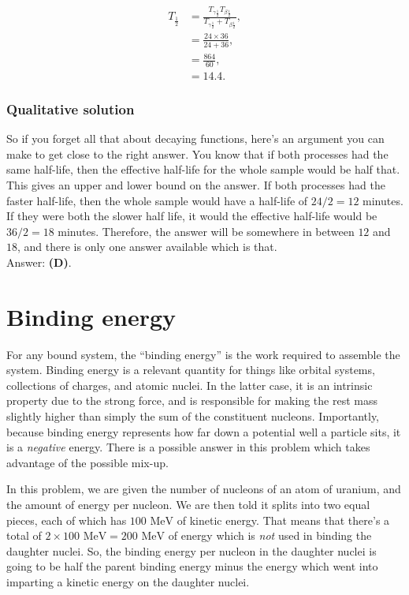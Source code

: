 \documentclass[11pt]{paper}
\newcommand{\answer}[1]{Answer: \textbf{(#1)}.}
\begin{document}
\begin{align}
T_{\frac{1}{2}} &= \frac{T_{\gamma\frac{1}{2}}T_{\beta\frac{1}{2}}}{T_{\gamma\frac{1}{2}}+T_{\beta\frac{1}{2}}},\\
&=\frac{24\times36}{24+36},\\
&=\frac{864}{60},\\
&=14.4.
\end{align}

\subsubsection*{Qualitative solution}
So if you forget all that about decaying functions, here's an argument you can make to get close to the right answer.  You know that if both processes had the same half-life, then the effective half-life for the whole sample would be half that.  This gives an upper and lower bound on the answer.  If both processes had the faster half-life, then the whole sample would have a half-life of $24/2 = 12$ minutes.  If they were both the slower half life, it would the effective half-life would be $36/2 = 18$ minutes.  Therefore, the answer will be somewhere in between $12$ and $18$, and there is only one answer available which is that.\\

\answer{D}

\section{Binding energy}
For any bound system, the ``binding energy'' is the work required to assemble the system.  Binding energy is a relevant quantity for things like orbital systems, collections of charges, and atomic nuclei.  In the latter case, it is an intrinsic property due to the strong force, and is responsible for making the rest mass slightly higher than simply the sum of the constituent nucleons.  Importantly, because binding energy represents how far down a potential well a particle sits, it is a \emph{negative} energy.  There is a possible answer in this problem which takes advantage of the possible mix-up.

In this problem, we are given the number of nucleons of an atom of uranium, and the amount of energy per nucleon.  We are then told it splits into two equal pieces, each of which has $100\text{ MeV}$ of kinetic energy.  That means that there's a total of $2\times100\text{ MeV} = 200\text{ MeV}$ of energy which is \emph{not} used in binding the daughter nuclei.  So, the binding energy per nucleon in the daughter nuclei is going to be half the parent binding energy minus the energy which went into imparting a kinetic energy on the daughter nuclei.
\end{document}
